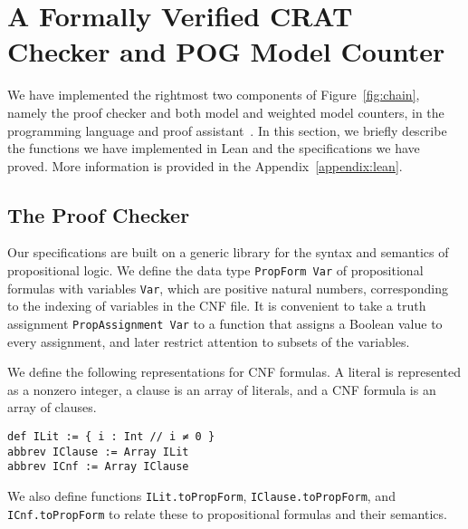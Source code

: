 \section{A Formally Verified CRAT Checker and POG Model Counter}

We have implemented the rightmost two components of Figure~\ref{fig:chain}, namely the
proof checker and both model and weighted model counters, in the \lean{} programming language
and proof assistant~\cite{demoura:cade:2021}.
In this section, we briefly describe the functions we have implemented in Lean and
the specifications we have proved.
More information is provided in the Appendix~\ref{appendix:lean}.

\subsection{The Proof Checker}
\label{subsection:proof:checker}

Our specifications are built on a generic library for the syntax and semantics of
propositional logic. We define the data type \lstinline{PropForm Var} of propositional
formulas with variables \lstinline{Var}, which are positive natural numbers,
corresponding to the indexing of variables in the CNF file.
It is convenient to take a truth assignment \lstinline{PropAssignment Var} to a function that
assigns a Boolean value to every assignment, and later restrict attention to subsets of the
variables.

We define the following representations for CNF formulas.
A literal is represented as a nonzero integer, a clause is an array of literals,
and a CNF formula is an array of clauses.
\begin{lstlisting}
def ILit := { i : Int // i ≠ 0 }
abbrev IClause := Array ILit
abbrev ICnf := Array IClause
\end{lstlisting}
We also define functions \lstinline{ILit.toPropForm}, \lstinline{IClause.toPropForm},
and \lstinline{ICnf.toPropForm} to relate these to propositional formulas and their
semantics.

